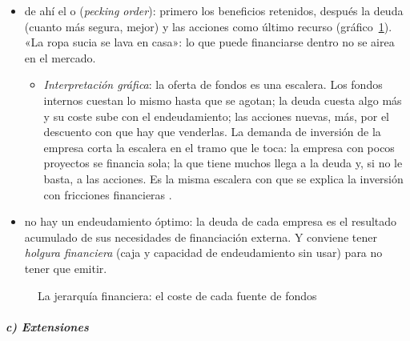 \documentclass[11pt]{article}
\begin{document}
\begin{itemize}
\begin{itemize}
  \item de ahí el  o  (\emph{pecking order})\nocite{Myers1984Capital}: primero los beneficios retenidos, después la deuda (cuanto más segura, mejor) y las acciones como último recurso (gráfico~\ref{fig:jerarquia}). «La ropa sucia se lava en casa»: lo que puede financiarse dentro no se airea en el mercado.
    \begin{itemize}
    \item \emph{Interpretación gráfica}: la oferta de fondos es una escalera. Los fondos internos cuestan lo mismo hasta que se agotan; la deuda cuesta algo más y su coste sube con el endeudamiento; las acciones nuevas, más, por el descuento con que hay que venderlas. La demanda de inversión de la empresa corta la escalera en el tramo que le toca: la empresa con pocos proyectos se financia sola; la que tiene muchos llega a la deuda y, si no le basta, a las acciones. Es la misma escalera con que se explica la inversión con fricciones financieras .
    \end{itemize}
  \item no hay un endeudamiento óptimo: la deuda de cada empresa es el resultado acumulado de sus necesidades de financiación externa. Y conviene tener \emph{holgura financiera} (caja y capacidad de endeudamiento sin usar) para no tener que emitir.
  \end{itemize}
\end{itemize}

\begin{figure}[H]
\centering
\caption{La jerarquía financiera: el coste de cada fuente de fondos}\label{fig:jerarquia}
\end{figure}

\subparagraph{c) Extensiones}
\end{document}
